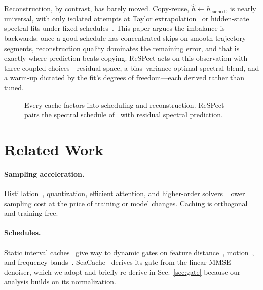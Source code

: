 \documentclass[10pt,twocolumn,letterpaper]{article}
\begin{document}
Reconstruction, by contrast, has barely moved. Copy-reuse,
$\hat{h} \gets h_{\mathrm{cached}}$, is nearly universal, with only
isolated attempts at Taylor extrapolation~\cite{taylorseer} or hidden-state
spectral fits under fixed schedules~\cite{spectrum}. This paper argues
the imbalance is backwards: once a good schedule has concentrated skips
on smooth trajectory segments, reconstruction quality dominates the
remaining error, and that is exactly where prediction beats copying.
ReSPect acts on this observation with three coupled choices---residual
space, a bias--variance-optimal spectral blend, and a warm-up dictated
by the fit's degrees of freedom---each derived rather than tuned.

\begin{figure}[t]
  \centering
  \caption{Every cache factors into scheduling and reconstruction.
  ReSPect pairs the spectral schedule of~\cite{seacache} with residual
  spectral prediction.}
  \label{fig:framework}
\end{figure}

\section{Related Work}
\label{sec:related}

\paragraph{Sampling acceleration.}
Distillation~\cite{consistency,dmd}, quantization, efficient attention,
and higher-order solvers~\cite{ddim,dpm} lower sampling cost at the price
of training or model changes. Caching is orthogonal and training-free.

\paragraph{Schedules.}
Static interval caches~\cite{fora,pab} give way to dynamic gates on
feature distance~\cite{teacache,dicache}, motion~\cite{adacache}, and
frequency bands~\cite{freqreuse}. SeaCache~\cite{seacache} derives its
gate from the linear-MMSE denoiser, which we adopt and briefly re-derive
in Sec.~\ref{sec:gate} because our analysis builds on its normalization.
\end{document}
